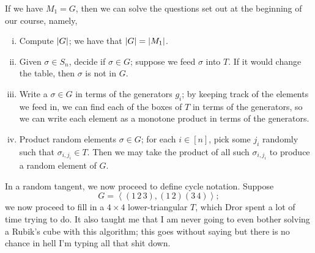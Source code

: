 \noindent If we have $M_1 = G$, then we can solve the questions set out at the beginning of our course, namely,
\begin{enumerate}[(i)]
    \item Compute $\left\lvert G \right\rvert$; we have that $\left\lvert G \right\rvert = \left\lvert M_1 \right\rvert$.
    \item Given $\sigma \in S_n$, decide if $\sigma \in G$; suppose we feed $\sigma$ into $T$. If it would change the table, then $\sigma$ is not in $G$.
    \item Write a $\sigma \in G$ in terms of the generators $g_i$; by keeping track of the elements we feed in, we can find each of the boxes of $T$ in terms of the generators, so we can write each element as a monotone product in terms of the generators.
    \item Product random elements $\sigma \in G$; for each $i \in [n]$, pick some $j_i$ randomly such that $\sigma_{i, j_i} \in T$. Then we may take the product of all such $\sigma_{i, j_i}$ to produce a random element of $G$.
\end{enumerate}
In a random tangent, we now proceed to define cycle notation. Suppose
\[ G = \left<(1 \, 2 \, 3), (1 \, 2) (3 \, 4)\right>;\]
we now proceed to fill in a $4 \times 4$ lower-triangular $T$, which Dror spent a lot of time trying to do. It also taught me that I am never going to even bother solving a Rubik's cube with this algorithm; this goes without saying but there is no chance in hell I'm typing all that shit down.